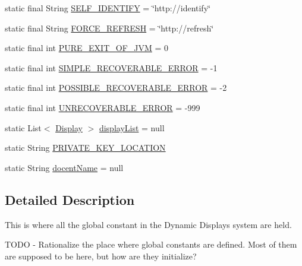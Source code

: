 \begin{DoxyCompactItemize}
\item 
static final String \hyperlink{classgov_1_1fnal_1_1ppd_1_1dd_1_1GlobalVariables_aaaf6fe49f89ce39ddba1fac773161acf}{S\-E\-L\-F\-\_\-\-I\-D\-E\-N\-T\-I\-F\-Y} = \char`\"{}http\-://identify\char`\"{}
\item 
static final String \hyperlink{classgov_1_1fnal_1_1ppd_1_1dd_1_1GlobalVariables_a79c44481889ff937b51e30d13d9c1c35}{F\-O\-R\-C\-E\-\_\-\-R\-E\-F\-R\-E\-S\-H} = \char`\"{}http\-://refresh\char`\"{}
\item 
static final int \hyperlink{classgov_1_1fnal_1_1ppd_1_1dd_1_1GlobalVariables_a9a5a3b99227fe4929fc0c3c664a922da}{P\-U\-R\-E\-\_\-\-E\-X\-I\-T\-\_\-\-O\-F\-\_\-\-J\-V\-M} = 0
\item 
static final int \hyperlink{classgov_1_1fnal_1_1ppd_1_1dd_1_1GlobalVariables_aa1eece63cce68ac0186379fc2fa2272a}{S\-I\-M\-P\-L\-E\-\_\-\-R\-E\-C\-O\-V\-E\-R\-A\-B\-L\-E\-\_\-\-E\-R\-R\-O\-R} = -\/1
\item 
static final int \hyperlink{classgov_1_1fnal_1_1ppd_1_1dd_1_1GlobalVariables_a9e5673ef7b6da85febe9775aebc9504c}{P\-O\-S\-S\-I\-B\-L\-E\-\_\-\-R\-E\-C\-O\-V\-E\-R\-A\-B\-L\-E\-\_\-\-E\-R\-R\-O\-R} = -\/2
\item 
static final int \hyperlink{classgov_1_1fnal_1_1ppd_1_1dd_1_1GlobalVariables_af2d69bd16e463355307ead1135160408}{U\-N\-R\-E\-C\-O\-V\-E\-R\-A\-B\-L\-E\-\_\-\-E\-R\-R\-O\-R} = -\/999
\item 
static List$<$ \hyperlink{interfacegov_1_1fnal_1_1ppd_1_1dd_1_1signage_1_1Display}{Display} $>$ \hyperlink{classgov_1_1fnal_1_1ppd_1_1dd_1_1GlobalVariables_a30efdc2ab60dd04f76dc1210b8447426}{display\-List} = null
\item 
static String \hyperlink{classgov_1_1fnal_1_1ppd_1_1dd_1_1GlobalVariables_aa26c21d05850efb85c8f5517d8258e5d}{P\-R\-I\-V\-A\-T\-E\-\_\-\-K\-E\-Y\-\_\-\-L\-O\-C\-A\-T\-I\-O\-N}
\item 
static String \hyperlink{classgov_1_1fnal_1_1ppd_1_1dd_1_1GlobalVariables_a1a8699e7b2ec1e9cad652869fedafa2b}{docent\-Name} = null
\end{DoxyCompactItemize}


\subsection{Detailed Description}
This is where all the global constant in the Dynamic Displays system are held.

T\-O\-D\-O -\/ Rationalize the place where global constants are defined. Most of them are supposed to be here, but how are they initialize?

